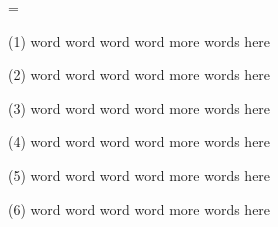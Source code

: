 %
%
%
%
%
\output={\plainoutput}
\vsize=40pt \hsize=120pt \parindent=10pt
\par (1) word word word word
more words here

\par (2) word word word word
more words here

\par (3) word word word word
more words here

\par (4) word word word word
more words here

\par (5) word word word word
more words here

\par (6) word word word word
more words here

